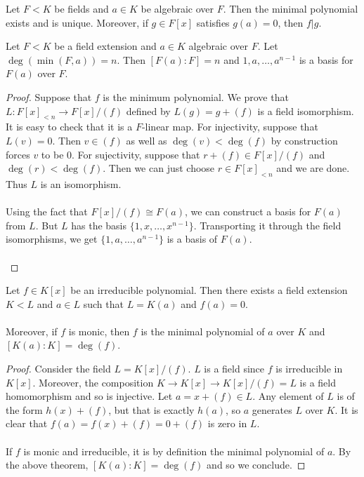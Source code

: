 \documentclass[a4paper]{article}
\begin{document}
\begin{prp}{}{} Let $F<K$ be fields and $a\in K$ be algebraic over $F$. Then the minimal polynomial exists and is unique. Moreover, if $g\in F[x]$ satisfies $g(a)=0$, then $f|g$. 
\end{prp}

\begin{prp}{}{} Let $F<K$ be a field extension and $a\in K$ algebraic over $F$. Let $\deg(\min(F,a))=n$. Then $[F(a):F]=n$ and $1,a,\dots,a^{n-1}$ is a basis for $F(a)$ over $F$. \tcbline
\begin{proof}
Suppose that $f$ is the minimum polynomial. We prove that $L:F[x]_{<n}\to F[x]/(f)$ defined by $L(g)=g+(f)$ is a field isomorphism. It is easy to check that it is a $F$-linear map. For injectivity, suppose that $L(v)=0$. Then $v\in(f)$ as well as $\deg(v)<\deg(f)$ by construction forces $v$ to be $0$. For sujectivity, suppose that $r+(f)\in F[x]/(f)$ and $\deg(r)<\deg(f)$. Then we can just choose $r\in F[x]_{<n}$ and we are done. Thus $L$ is an isomorphism. \\~\\
Using the fact that $F[x]/(f)\cong F(a)$, we can construct a basis for $F(a)$ from $L$. But $L$ has the basis $\{1,x,\dots,x^{n-1}\}$. Transporting it through the field isomorphisms, we get $\{1,a,\dots,a^{n-1}\}$ is a basis of $F(a)$. \\~\\
\end{proof}
\end{prp}

\begin{prp}{}{} Let $f\in K[x]$ be an irreducible polynomial. Then there exists a field extension $K<L$ and $a\in L$ such that $L=K(a)$ and $f(a)=0$. \\~\\

Moreover, if $f$ is monic, then $f$ is the minimal polynomial of $a$ over $K$ and $[K(a):K]=\deg(f)$. \tcbline
\begin{proof}
Consider the field $L=K[x]/(f)$. $L$ is a field since $f$ is irreducible in $K[x]$. Moreover, the composition $K\to K[x]\to K[x]/(f)=L$ is a field homomorphism and so is injective. Let $a=x+(f)\in L$. Any element of $L$ is of the form $h(x)+(f)$, but that is exactly $h(a)$, so $a$ generates $L$ over $K$. It is clear that $f(a)=f(x)+(f)=0+(f)$ is zero in $L$. \\~\\

If $f$ is monic and irreducible, it is by definition the minimal polynomial of $a$. By the above theorem, $[K(a):K]=\deg(f)$ and so we conclude. 
\end{proof}
\end{prp}
\end{document}
